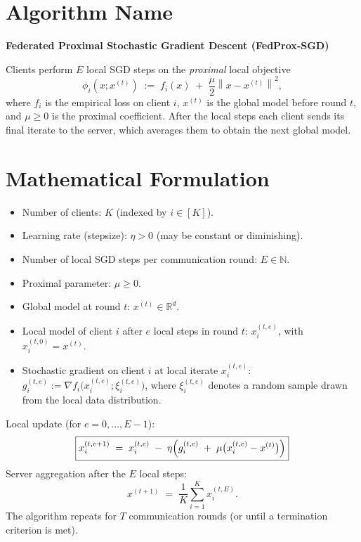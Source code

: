 \documentclass{article}
\newcommand{\norm}[1]{\left\lVert#1\right\rVert}
\begin{document}
\section*{Algorithm Name}
\textbf{Federated Proximal Stochastic Gradient Descent (FedProx‑SGD)}  

Clients perform $E$ local SGD steps on the \emph{proximal} local objective
\[
\phi_i(x;x^{(t)})\;:=\;f_i(x)\;+\;\frac{\mu}{2}\norm{x-x^{(t)}}^{2},
\]
where $f_i$ is the empirical loss on client $i$, $x^{(t)}$ is the global model before round $t$, and $\mu\ge 0$ is the proximal coefficient. After the local steps each client sends its final iterate to the server, which averages them to obtain the next global model.

\vspace{0.2cm}
\section*{Mathematical Formulation}
\begin{itemize}
    \item Number of clients: $K$ (indexed by $i\in[K]$).
    \item Learning rate (stepsize): $\eta>0$ (may be constant or diminishing).
    \item Number of local SGD steps per communication round: $E\in\mathbb{N}$.
    \item Proximal parameter: $\mu\ge 0$.
    \item Global model at round $t$: $x^{(t)}\in\mathbb{R}^{d}$.
    \item Local model of client $i$ after $e$ local steps in round $t$: $x_{i}^{(t,e)}$,
          with $x_{i}^{(t,0)}=x^{(t)}$.
    \item Stochastic gradient on client $i$ at local iterate $x_{i}^{(t,e)}$:
          $g_{i}^{(t,e)}:=\nabla f_i\bigl(x_{i}^{(t,e)}; \xi_{i}^{(t,e)}\bigr)$,
          where $\xi_{i}^{(t,e)}$ denotes a random sample drawn from the local data distribution.
\end{itemize}
Local update (for $e=0,\dots,E-1$):
\begin{equation}
\boxed{
x_{i}^{(t,e+1)}\;=\;x_{i}^{(t,e)}\;-\;\eta\Bigl(g_{i}^{(t,e)}\;+\;\mu\bigl(x_{i}^{(t,e)}-x^{(t)}\bigr)\Bigr)
}
\label{eq:local-update}
\end{equation}
Server aggregation after the $E$ local steps:
\begin{equation}
\boxed{
x^{(t+1)}\;=\;\frac{1}{K}\sum_{i=1}^{K}x_{i}^{(t,E)}.
}
\label{eq:global-agg}
\end{equation}
The algorithm repeats for $T$ communication rounds (or until a termination criterion is met).
\end{document}

